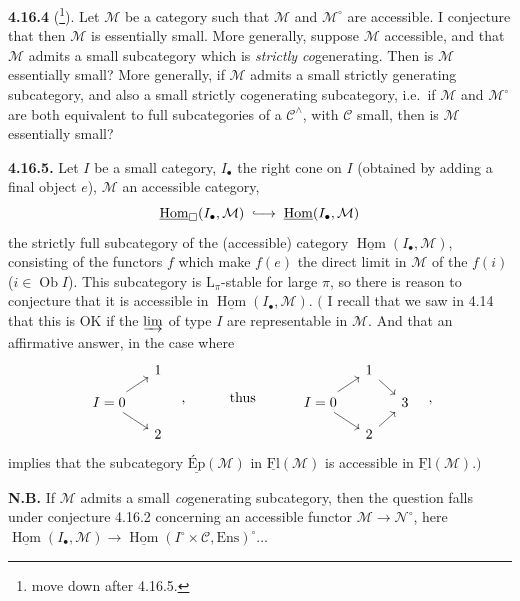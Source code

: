 \documentclass[11pt]{article}
\newcommand{\printedpage}[1]{\marginpar{\footnotesize p.~#1}}
\newcommand{\msp}[1]{\marginpar{\footnotesize [#1]}}
\newcommand{\Hom}{\operatorname{Hom}}
\newcommand{\Ob}{\operatorname{Ob}}
\newcommand{\Ens}{\mathrm{Ens}}
\newcommand{\into}{\lhook\joinrel\longrightarrow}
\begin{document}
\msp{472}

\textbf{4.16.4} (\footnote[194]{move down after 4.16.5.}). Let $\mathcal{M}$ be a category such that $\mathcal{M}$ and $\mathcal{M}^\circ$ are accessible. I conjecture that then $\mathcal{M}$ is essentially small. More generally, suppose $\mathcal{M}$ accessible, and that $\mathcal{M}$ admits a small subcategory which is \textit{strictly co}generating. Then is $\mathcal{M}$ essentially small? More generally, if $\mathcal{M}$ admits a small strictly generating subcategory, and also a small strictly cogenerating subcategory, i.e.\ if $\mathcal{M}$ and $\mathcal{M}^\circ$ are both equivalent to full subcategories of a $\mathcal{C}^\wedge$, with $\mathcal{C}$ small, then is $\mathcal{M}$ essentially small?

\textbf{4.16.5.} Let $I$ be a small category, $I_\bullet$ the right cone on $I$ (obtained by adding a final object $e$), $\mathcal{M}$ an accessible category,
\[
\underline{\Hom}_{\square}(I_\bullet,\mathcal{M}) \;\into\; \underline{\Hom}(I_\bullet,\mathcal{M})
\]
the strictly full subcategory of the (accessible) category $\underline{\Hom}(I_\bullet,\mathcal{M})$, consisting of the functors $f$ which make $f(e)$ the direct limit in $\mathcal{M}$ of the $f(i)$ ($i \in \Ob I$). This subcategory is $\mathrm{L}_\pi$-stable for large $\pi$, so there is reason
\msp{473}
to conjecture that it is accessible in $\underline{\Hom}(I_\bullet,\mathcal{M})$. $\Big($ I recall that we saw in 4.14 that this is OK if the $\varinjlim$ of type $I$ are representable in $\mathcal{M}$. And that an affirmative answer, in the case where
\printedpage{183}
\[
\begin{tikzcd}[row sep=small, column sep=small]
 & 1 \\
I = 0 \arrow[ur] \arrow[dr] & \\
 & 2
\end{tikzcd}
\quad ,\qquad\quad \text{thus} \qquad\quad
\begin{tikzcd}[row sep=small, column sep=small]
 & 1 \arrow[dr] & \\
I = 0 \arrow[ur] \arrow[dr] & & 3 \\
 & 2 \arrow[ur] &
\end{tikzcd}
\quad ,
\]
implies that the subcategory $\underline{\text{Ép}}(\mathcal{M})$ in $\underline{\mathrm{Fl}}(\mathcal{M})$ is accessible in $\underline{\mathrm{Fl}}(\mathcal{M})$.$\Big)$

\textbf{N.B.} If $\mathcal{M}$ admits a small \textit{co}generating subcategory, then the question falls under conjecture 4.16.2 concerning an accessible functor $\mathcal{M} \longrightarrow \mathcal{N}^\circ$, here $\underline{\Hom}(I_\bullet,\mathcal{M}) \longrightarrow \underline{\Hom}(I^\circ \times \mathcal{C},\Ens)^\circ \dots$
\end{document}

